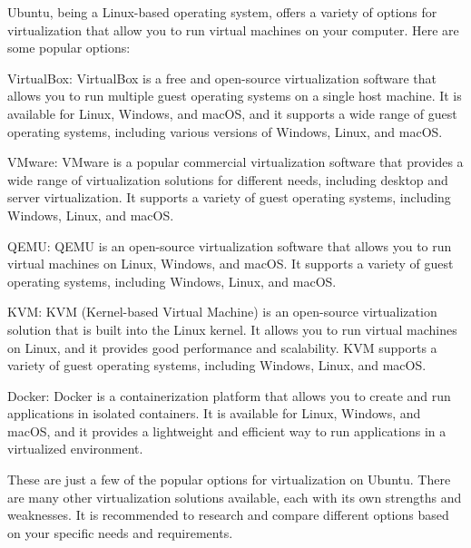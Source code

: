 Ubuntu, being a Linux-based operating system, offers a variety of options for virtualization that allow you to run virtual machines on your computer. Here are some popular options:

VirtualBox: VirtualBox is a free and open-source virtualization software that allows you to run multiple guest operating systems on a single host machine. It is available for Linux, Windows, and macOS, and it supports a wide range of guest operating systems, including various versions of Windows, Linux, and macOS.

VMware: VMware is a popular commercial virtualization software that provides a wide range of virtualization solutions for different needs, including desktop and server virtualization. It supports a variety of guest operating systems, including Windows, Linux, and macOS.

QEMU: QEMU is an open-source virtualization software that allows you to run virtual machines on Linux, Windows, and macOS. It supports a variety of guest operating systems, including Windows, Linux, and macOS.

KVM: KVM (Kernel-based Virtual Machine) is an open-source virtualization solution that is built into the Linux kernel. It allows you to run virtual machines on Linux, and it provides good performance and scalability. KVM supports a variety of guest operating systems, including Windows, Linux, and macOS.

Docker: Docker is a containerization platform that allows you to create and run applications in isolated containers. It is available for Linux, Windows, and macOS, and it provides a lightweight and efficient way to run applications in a virtualized environment.

These are just a few of the popular options for virtualization on Ubuntu. There are many other virtualization solutions available, each with its own strengths and weaknesses. It is recommended to research and compare different options based on your specific needs and requirements.

